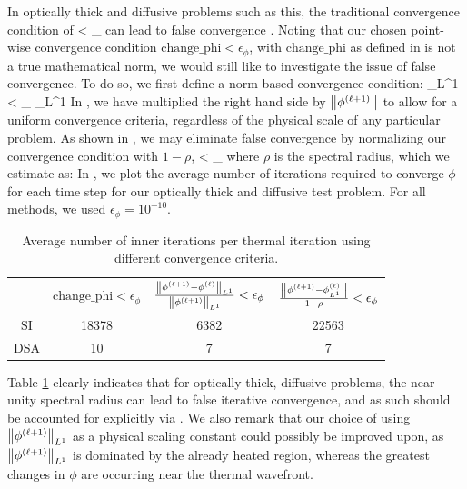 In optically thick and diffusive problems such as this, the traditional convergence condition of 
\benum
{} < \epsilon_{\phi} \pec
\eenum
can lead to false convergence \cite{adams_larsen_fast_iterative}.
Noting that our chosen point-wise convergence condition $\text{change\_phi} < \epsilon_{\phi}$, with $\text{change\_phi}$ as defined in   is not a true mathematical norm, we would still like to investigate the issue of false convergence.
To do so, we first define a norm based convergence condition:
\benum
{}_{L^1} < \epsilon_{\phi} _{L^1} \pep
\label{eq:l1}
\eenum
In , we have multiplied the right hand side by $\left\lVert  \phi^{(\ell+1)}  \right\rVert$ to allow for a uniform convergence criteria, regardless of the physical scale of any particular problem.
As shown in \cite{adams_larsen_fast_iterative}, we may eliminate false convergence by normalizing our convergence condition with $1-\rho$,
\benum
{}< \epsilon_{\phi} \pec
\label{eq:rho_convergence}
\eenum
where $\rho$ is the spectral radius, which we estimate as:
\benum
\rho \approx {}\pep
\eenum
In , we plot the average number of iterations required to converge $\phi$ for each time step for our optically thick and diffusive test problem.  For all methods, we used $\epsilon_{\phi} = 10^{-10}$.
\begin{table}[!hbp]
\centering
\caption{Average number of inner iterations per thermal iteration using different convergence criteria.}
\label{tbl:rho_iters}
\begin{tabular}{|c|c|c|c|}
\hline
{}  &  $\text{change\_phi} <\epsilon_{\phi}$ & 
		$ \frac{\left\lVert  \phi^{(\ell+1)} - \phi^{(\ell)}  \right\rVert_{L^1} }{ \left\lVert  \phi^{(\ell+1)} \right\rVert_{L^1}  } < \epsilon_{\phi}$  & 
		$\frac{\left\lVert \phi^{(\ell+1)} - \phi^{(\ell)}_{L^1}  \right\rVert }{ 1- \rho}< \epsilon_{\phi} $\\
		\hline
SI & 18378 & 6382 & 22563 \\
\hline
DSA & 10 & 7 & 7 \\
\hline
\end{tabular}
\end{table}
Table \ref{tbl:rho_iters} clearly indicates that for optically thick, diffusive problems, the near unity spectral radius can lead to false iterative convergence, and as such should be accounted for explicitly via .  
We also remark that our choice of using $\left\lVert \phi^{(\ell+1)}  \right\rVert_{L^1}$ as a physical scaling constant could possibly be improved upon, as $\left\lVert \phi^{(\ell+1)} \right\rVert_{L^1}$ is dominated by the already heated region, whereas the greatest changes in $\phi$ are occurring near the thermal wavefront.



